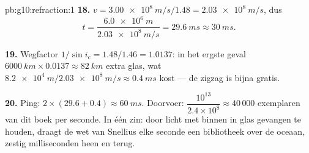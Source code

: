 \begin{solution}{pb:g10:refraction:1}
\textbf{18.} $v = \qty{3.00e8}{m/s}/1.48 = \qty{2.03e8}{m/s}$, dus
\[
t = \frac{\qty{6.0e6}{m}}{\qty{2.03e8}{m/s}} = \qty{29.6}{ms} \approx
\qty{30}{ms}.
\]

\textbf{19.} Wegfactor $1/\sin i_c = 1.48/1.46 = 1.0137$: in het ergste
geval $\qty{6000}{km} \times 0.0137 \approx \qty{82}{km}$ extra glas, wat
$\qty{8.2e4}{m} / \qty{2.03e8}{m/s} \approx \qty{0.4}{ms}$ kost --- de
zigzag is bijna gratis.

\textbf{20.} Ping: $2 \times (29.6 + 0.4) \approx \qty{60}{ms}$.
Doorvoer: $\dfrac{10^{13}}{2.4 \times 10^8} \approx 40\,000$ exemplaren
van dit boek per seconde. In één zin: door licht met  binnen in glas gevangen te houden, draagt de wet van
Snellius elke seconde een bibliotheek over de oceaan, zestig
milliseconden heen en terug.
\end{solution}
